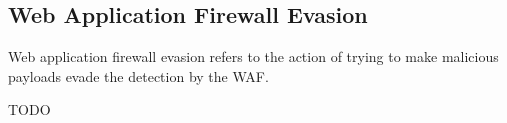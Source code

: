 \subsection{Web Application Firewall Evasion}
Web application firewall evasion refers to the action of trying to make malicious payloads evade the detection by the WAF.



{\color{red} TODO}
